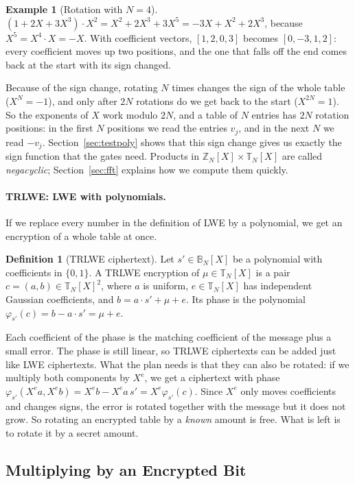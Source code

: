 \documentclass[12pt]{article}
\theoremstyle{plain}
\theoremstyle{definition}
\newtheorem{definition}{Definition}
\newtheorem{example}{Example}
\newcommand{\T}{\mathbb{T}}
\newcommand{\Z}{\mathbb{Z}}
\newcommand{\B}{\mathbb{B}}
\newcommand{\TN}{\T_N[X]}
\newcommand{\ZN}{\Z_N[X]}
\newcommand{\BN}{\B_N[X]}
\begin{document}
\begin{example}[Rotation with $N=4$]
$(1+2X+3X^3)\cdot X^2=X^2+2X^3+3X^5=-3X+X^2+2X^3$, because
$X^5=X^4\cdot X=-X$. With coefficient vectors, $[1,2,0,3]$ becomes
$[0,-3,1,2]$: every coefficient moves up two positions, and the one that falls
off the end comes back at the start with its sign changed.
\end{example}

Because of the sign change, rotating $N$ times changes the sign of the whole
table ($X^N=-1$), and only after $2N$ rotations do we get back to the start
($X^{2N}=1$). So the exponents of $X$ work modulo $2N$, and a table of $N$
entries has $2N$ rotation positions: in the first $N$ positions we read the
entries $v_j$, and in the next $N$ we read $-v_j$. Section~\ref{sec:testpoly}
shows that this sign change gives us exactly the sign function that the gates
need. Products in $\ZN\times\TN$ are called \emph{negacyclic};
Section~\ref{sec:fft} explains how we compute them quickly.

\paragraph{TRLWE: LWE with polynomials.}
If we replace every number in the definition of LWE by a polynomial, we get an
encryption of a whole table at once.

\begin{definition}[TRLWE ciphertext]
Let $s'\in\BN$ be a polynomial with coefficients in $\{0,1\}$. A TRLWE
encryption of $\mu\in\TN$ is a pair $c=(a,b)\in\TN^2$, where $a$ is uniform,
$e\in\TN$ has independent Gaussian coefficients, and $b=a\cdot s'+\mu+e$. Its
phase is the polynomial $\varphi_{s'}(c)=b-a\cdot s'=\mu+e$.
\end{definition}

Each coefficient of the phase is the matching coefficient of the message plus a
small error. The phase is still linear, so TRLWE ciphertexts can be added just
like LWE ciphertexts. What the plan needs is that they can also be rotated: if
we multiply both components by $X^e$, we get a ciphertext with phase
$\varphi_{s'}(X^ea,X^eb)=X^eb-X^ea\,s'=X^e\varphi_{s'}(c)$. Since $X^e$ only moves
coefficients and changes signs, the error is rotated together with the message
but it does not grow. So rotating an encrypted table by a \emph{known} amount
is free. What is left is to rotate it by a secret amount.

\subsection{Multiplying by an Encrypted Bit}
\label{sec:extprod}
\end{document}
